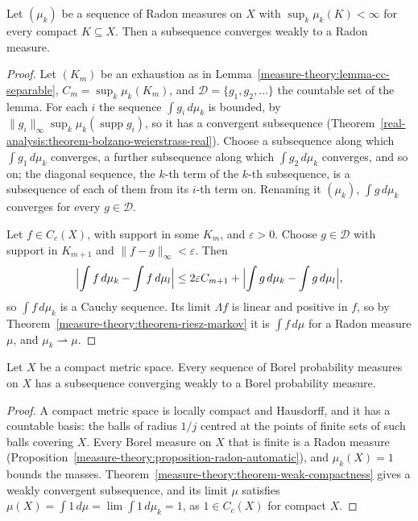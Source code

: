 \begin{theorem}\label{measure-theory:theorem-weak-compactness}
Let $(\mu_k)$ be a sequence of Radon measures on $X$ with $\sup_k\mu_k(K) < \infty$ for every compact $K \subseteq X$. Then a subsequence converges weakly to a Radon measure.
\end{theorem}

\begin{proof}
Let $(K_m)$ be an exhaustion as in Lemma~\ref{measure-theory:lemma-cc-separable}, $C_m = \sup_k\mu_k(K_m)$, and $\mathcal{D} = \{g_1, g_2, \ldots\}$ the countable set of the lemma. For each $i$ the
sequence $\int g_i\,d\mu_k$ is bounded, by $\|g_i\|_\infty\sup_k\mu_k(\operatorname{supp}g_i)$, so it has a convergent subsequence (Theorem~\ref{real-analysis:theorem-bolzano-weierstrass-real}).
Choose a subsequence along which $\int g_1\,d\mu_k$ converges, a further subsequence along which $\int g_2\,d\mu_k$ converges, and so on; the diagonal sequence, the $k$-th term of the $k$-th
subsequence, is a subsequence of each of them from its $i$-th term on. Renaming it $(\mu_k)$, $\int g\,d\mu_k$ converges for every $g \in \mathcal{D}$.

Let $f \in C_c(X)$, with support in some $K_m$, and $\varepsilon > 0$. Choose $g \in \mathcal{D}$ with support in $K_{m+1}$ and $\|f - g\|_\infty < \varepsilon$. Then
\[
\Bigl|\int f\,d\mu_k - \int f\,d\mu_l\Bigr| \leq 2\varepsilon C_{m+1} + \Bigl|\int g\,d\mu_k - \int g\,d\mu_l\Bigr|,
\]
so $\int f\,d\mu_k$ is a Cauchy sequence. Its limit $\Lambda f$ is linear and positive in $f$, so by Theorem~\ref{measure-theory:theorem-riesz-markov} it is $\int f\,d\mu$ for a Radon measure $\mu$, and
$\mu_k \rightharpoonup \mu$.
\end{proof}

\begin{corollary}\label{measure-theory:corollary-probability-compact}
Let $X$ be a compact metric space. Every sequence of Borel probability measures on $X$ has a subsequence converging weakly to a Borel probability measure.
\end{corollary}

\begin{proof}
A compact metric space is locally compact and Hausdorff, and it has a countable basis: the balls of radius $1/j$ centred at the points of finite sets of such balls covering $X$. Every Borel measure on
$X$ that is finite is a Radon measure (Proposition~\ref{measure-theory:proposition-radon-automatic}), and $\mu_k(X) = 1$ bounds the masses. Theorem~\ref{measure-theory:theorem-weak-compactness} gives a
weakly convergent subsequence, and its limit $\mu$ satisfies $\mu(X) = \int 1\,d\mu = \lim\int 1\,d\mu_k = 1$, as $1 \in C_c(X)$ for compact $X$.
\end{proof}

